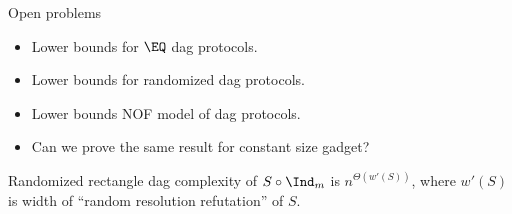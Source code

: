 \begin{frame}{Open problems}

    \begin{itemize}
        \item Lower bounds for $\EQ$ dag protocols.
        \item Lower bounds for randomized dag protocols.
        \item Lower bounds NOF model of dag protocols.
        \item Can we prove the same result for constant size gadget?
    \end{itemize}

    \begin{conjecture}
        Randomized rectangle dag complexity of $S \circ \Ind_{m}$ is $n^{\Theta(w'(S))}$, where $w'(S)$ is
        width of ``random resolution refutation'' of $S$.
    \end{conjecture}
\end{frame}
